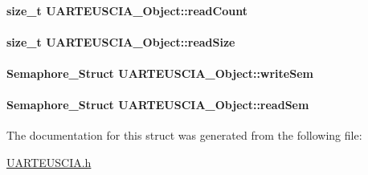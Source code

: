 \paragraph[{read\-Count}]{\setlength{\rightskip}{0pt plus 5cm}size\-\_\-t U\-A\-R\-T\-E\-U\-S\-C\-I\-A\-\_\-\-Object\-::read\-Count}\label{struct_u_a_r_t_e_u_s_c_i_a___object_a14152735a1233c10b0323ed9e8db73b5}
\paragraph[{read\-Size}]{\setlength{\rightskip}{0pt plus 5cm}size\-\_\-t U\-A\-R\-T\-E\-U\-S\-C\-I\-A\-\_\-\-Object\-::read\-Size}\label{struct_u_a_r_t_e_u_s_c_i_a___object_a012cc439c2053feea7019ffe985cf8b8}
\paragraph[{write\-Sem}]{\setlength{\rightskip}{0pt plus 5cm}Semaphore\-\_\-\-Struct U\-A\-R\-T\-E\-U\-S\-C\-I\-A\-\_\-\-Object\-::write\-Sem}\label{struct_u_a_r_t_e_u_s_c_i_a___object_a7d580f915e87c3a315401f488d0ce1d4}
\paragraph[{read\-Sem}]{\setlength{\rightskip}{0pt plus 5cm}Semaphore\-\_\-\-Struct U\-A\-R\-T\-E\-U\-S\-C\-I\-A\-\_\-\-Object\-::read\-Sem}\label{struct_u_a_r_t_e_u_s_c_i_a___object_a5bd9e0e33dcb2c8a2004fb920f745fe5}


The documentation for this struct was generated from the following file\-:\begin{DoxyCompactItemize}
\item 
\hyperlink{_u_a_r_t_e_u_s_c_i_a_8h}{U\-A\-R\-T\-E\-U\-S\-C\-I\-A.\-h}\end{DoxyCompactItemize}
